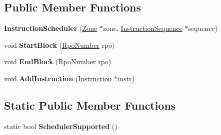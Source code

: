 \subsection*{Public Member Functions}
\begin{DoxyCompactItemize}
\item 
{\bfseries Instruction\+Scheduler} (\hyperlink{classv8_1_1internal_1_1_zone}{Zone} $\ast$zone, \hyperlink{classv8_1_1internal_1_1compiler_1_1_instruction_sequence}{Instruction\+Sequence} $\ast$sequence)\hypertarget{classv8_1_1internal_1_1compiler_1_1_instruction_scheduler_a05e3da1730c88297d072e4a72aa9b95d}{}\label{classv8_1_1internal_1_1compiler_1_1_instruction_scheduler_a05e3da1730c88297d072e4a72aa9b95d}

\item 
void {\bfseries Start\+Block} (\hyperlink{classv8_1_1internal_1_1compiler_1_1_rpo_number}{Rpo\+Number} rpo)\hypertarget{classv8_1_1internal_1_1compiler_1_1_instruction_scheduler_a2fdf835db37886ba20a703d0d464613a}{}\label{classv8_1_1internal_1_1compiler_1_1_instruction_scheduler_a2fdf835db37886ba20a703d0d464613a}

\item 
void {\bfseries End\+Block} (\hyperlink{classv8_1_1internal_1_1compiler_1_1_rpo_number}{Rpo\+Number} rpo)\hypertarget{classv8_1_1internal_1_1compiler_1_1_instruction_scheduler_aef690db2c8ec7eab249c4bd5c1a3f4b7}{}\label{classv8_1_1internal_1_1compiler_1_1_instruction_scheduler_aef690db2c8ec7eab249c4bd5c1a3f4b7}

\item 
void {\bfseries Add\+Instruction} (\hyperlink{classv8_1_1internal_1_1compiler_1_1_instruction}{Instruction} $\ast$instr)\hypertarget{classv8_1_1internal_1_1compiler_1_1_instruction_scheduler_abd121cebb713f0e800ed05ed10ea3d3f}{}\label{classv8_1_1internal_1_1compiler_1_1_instruction_scheduler_abd121cebb713f0e800ed05ed10ea3d3f}

\end{DoxyCompactItemize}
\subsection*{Static Public Member Functions}
\begin{DoxyCompactItemize}
\item 
static bool {\bfseries Scheduler\+Supported} ()\hypertarget{classv8_1_1internal_1_1compiler_1_1_instruction_scheduler_a3a12caa2a5f6def102ff7e343f7b8e5f}{}\label{classv8_1_1internal_1_1compiler_1_1_instruction_scheduler_a3a12caa2a5f6def102ff7e343f7b8e5f}

\end{DoxyCompactItemize}
